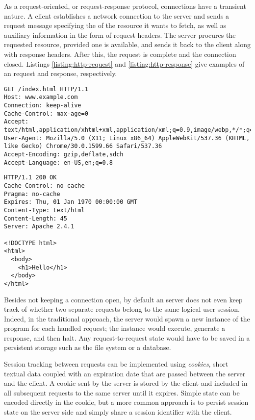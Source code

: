 As a request-oriented, or request-response protocol,  connections have a transient nature. A client establishes a network connection to the server and sends a request message specifying the  of the resource it wants to fetch, as well as auxiliary information in the form of request headers. The server procures the requested resource, provided one is available, and sends it back to the client along with response headers. After this, the request is complete and the connection closed. Listings \ref{listing:http-request} and \ref{listing:http-response} give examples of an  request and response, respectively. \cite{HTTP11}

\begin{code}
\begin{lstlisting}[breaklines,caption=A typical \ab{http} request.\label{listing:http-request}]
GET /index.html HTTP/1.1
Host: www.example.com
Connection: keep-alive
Cache-Control: max-age=0
Accept: text/html,application/xhtml+xml,application/xml;q=0.9,image/webp,*/*;q=0.8
User-Agent: Mozilla/5.0 (X11; Linux x86_64) AppleWebKit/537.36 (KHTML, like Gecko) Chrome/30.0.1599.66 Safari/537.36
Accept-Encoding: gzip,deflate,sdch
Accept-Language: en-US,en;q=0.8
\end{lstlisting}
\end{code}

\begin{code}
\begin{lstlisting}[breaklines,caption=A typical \ab{http} response.\label{listing:http-response}]
HTTP/1.1 200 OK
Cache-Control: no-cache
Pragma: no-cache
Expires: Thu, 01 Jan 1970 00:00:00 GMT
Content-Type: text/html
Content-Length: 45
Server: Apache 2.4.1

<!DOCTYPE html>
<html>
  <body>
    <h1>Hello</h1>
  </body>
</html>
\end{lstlisting}
\end{code}

Besides not keeping a connection open, by default an  server does not even keep track of whether two separate requests belong to the same logical user session. Indeed, in the traditional  approach, the server would spawn a new instance of the  program for each handled request; the instance would execute, generate a response, and then halt. Any request-to-request state would have to be saved in a persistent storage such as the file system or a database.

Session tracking between requests can be implemented using \emph{cookies}, short textual data coupled with an expiration date that are passed between the server and the client. A cookie sent by the server is stored by the client and included in all subsequent requests to the same server until it expires. Simple state can be encoded directly in the cookie, but a more common approach is to persist session state on the server side and simply share a session identifier with the client. \cite{HTTPState}

